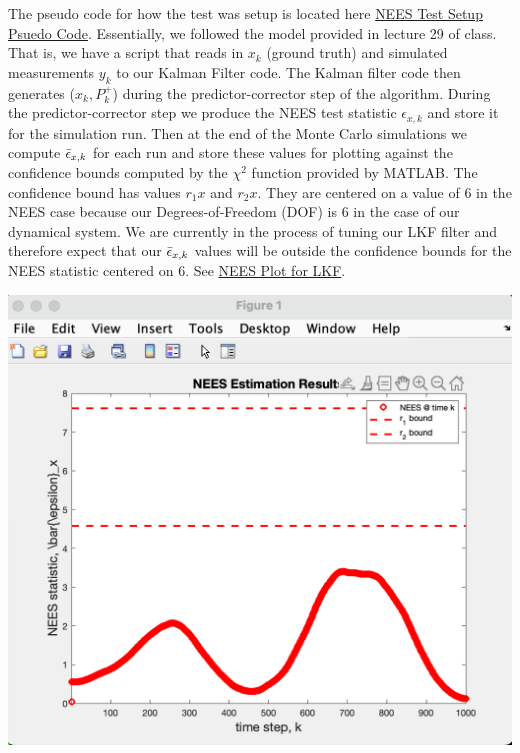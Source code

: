 \documentclass[paper=a4, fontsize=11pt]{scrartcl} %
\numberwithin{equation}{section} %
\numberwithin{figure}{section} %
\numberwithin{table}{section} %
\begin{document}
\begin{framed}
The pseudo code for how the test was setup is located here \hyperref[alg:TMT_nees_algo]{NEES Test Setup Psuedo Code}.  Essentially, we followed the model provided in lecture 29 of class. That is, we have a script that reads in $x_k$ (ground truth) and simulated measurements $y_k$ to our Kalman Filter code.  The Kalman filter code then generates ($\hat{x}_k, P^{+}_k$) during the predictor-corrector step of the algorithm. During the predictor-corrector step we produce the NEES test statistic $\epsilon_{x,k}$ and store it for the simulation run.  Then at the end of the Monte Carlo simulations we compute $\Bar{\epsilon}_{x,k}$ for each run and store these values for plotting against the confidence bounds computed by the $\chi^2$ function provided by MATLAB.  The confidence bound has values $r_1x$ and $r_2x$.  They are centered on a value of 6 in the NEES case because our Degrees-of-Freedom (DOF) is 6 in the case of our dynamical system.  
\newline
We are currently in the process of tuning our LKF filter and therefore expect that our $\Bar{\epsilon}_{x,k}$ values will be outside the confidence bounds for the NEES statistic centered on 6.  See \hyperref[fig:nees_plot_lkf]{NEES Plot for LKF}.
\newline
\begin{minipage}[t]{1\linewidth}
   \vspace{-2ex}
   \centering
   \includegraphics[scale=0.42]{NEES_stat.png}
   \label{fig:nees_plot_lkf}
\end{minipage}


\end{framed}
\end{document}

